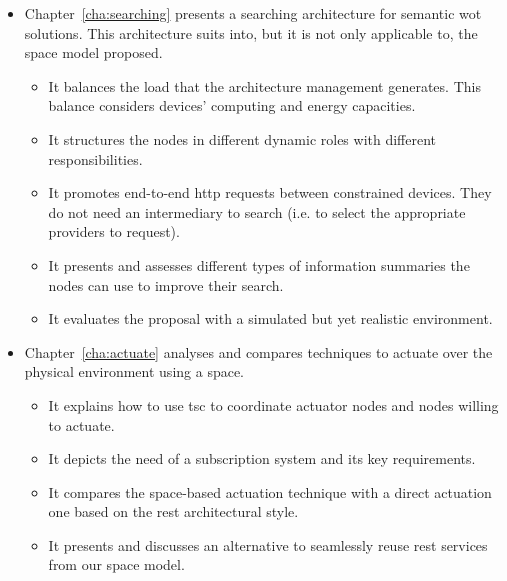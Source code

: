 \begin{itemize}
  \item Chapter~\ref{cha:searching} presents a searching architecture for semantic \ac{wot} solutions.
        This architecture suits into, but it is not only applicable to, the space model proposed.
    \begin{itemize}
      \item It balances the load that the architecture management generates.
	    This balance considers devices' computing and energy capacities.
      \item It structures the nodes in different dynamic roles with different responsibilities. %
      \item It promotes end-to-end \ac{http} requests between constrained devices.
            They do not need an intermediary to search (i.e. to select the appropriate providers to request). %
      \item It presents and assesses different types of information summaries the nodes can use to improve their search.
      \item It evaluates the proposal with a simulated but yet realistic environment.
    \end{itemize}
    
  \item Chapter~\ref{cha:actuate} analyses and compares techniques to actuate over the physical environment using a space. %
    \begin{itemize}
      \item It explains how to use \ac{tsc} to coordinate actuator nodes and nodes willing to actuate.
      \item It depicts the need of a subscription system and its key requirements.
      \item It compares the space-based actuation technique with a direct actuation one based on the \ac{rest} architectural style. %
      \item It presents and discusses an alternative to seamlessly reuse \ac{rest} services from our space model.
    \end{itemize}
  

\end{itemize}
